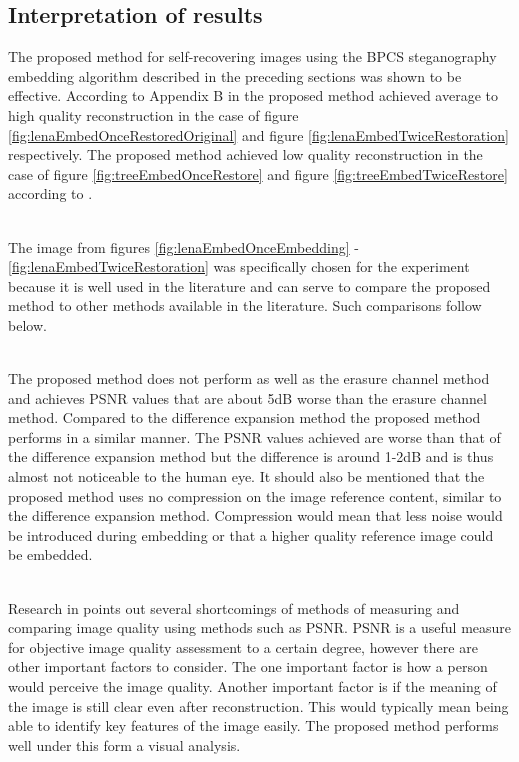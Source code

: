 \documentclass[12pt]{article}
\begin{document}
\subsection{Interpretation of results}
\label{interpretation}
The proposed method for self-recovering images using the BPCS steganography embedding algorithm described in the preceding sections was shown to be effective.
According to Appendix B in \cite{korus2013efficient} the proposed method achieved average to high quality reconstruction in the case of figure \ref{fig:lenaEmbedOnceRestoredOriginal}  and figure \ref{fig:lenaEmbedTwiceRestoration} respectively.
The proposed method achieved low quality reconstruction in the case of figure \ref{fig:treeEmbedOnceRestore} and figure \ref{fig:treeEmbedTwiceRestore} according to \cite{korus2013efficient}.

\hspace{0pt} \\
The image from figures \ref{fig:lenaEmbedOnceEmbedding} - \ref{fig:lenaEmbedTwiceRestoration} was specifically chosen for the experiment because it is well used in the literature and can serve to compare the proposed method to other methods available in the literature.
Such comparisons follow below. 

\hspace{0pt} \\
The proposed method does not perform as well as the erasure channel method and achieves PSNR values that are about 5dB worse than the erasure channel method.
Compared to the difference expansion method the proposed method performs in a similar manner.
The PSNR values achieved are worse than that of the difference expansion method but the difference is around 1-2dB and is thus almost not noticeable to the human eye.
It should also be mentioned that the proposed method uses no compression on the image reference content, similar to the difference expansion method.
Compression would mean that less noise would be introduced during embedding or that a higher quality reference image could be embedded. 

\hspace{0pt} \\
Research in \cite{wang2002image} points out several shortcomings of methods of measuring and comparing image quality using methods such as PSNR. 
PSNR is a useful measure for objective image quality assessment to a certain degree, however there are other important factors to consider. 
The one important factor is how a person would perceive the image quality.
Another important factor is if the meaning of the image is still clear even after reconstruction.
This would typically mean being able to identify key features of the image easily. 
The proposed method performs well under this form a visual analysis.
\end{document}
